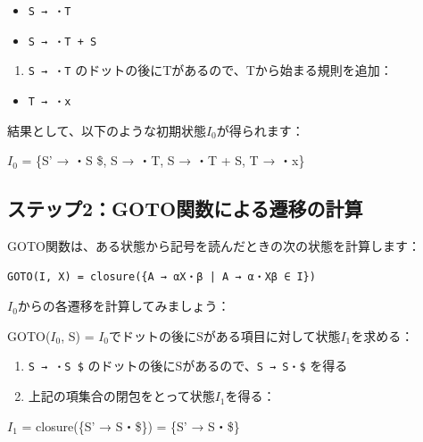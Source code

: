 \begin{itemize}
\tightlist
\item
  \texttt{S\ →\ ・T}
\item
  \texttt{S\ →\ ・T\ +\ S}
\end{itemize}

\begin{enumerate}
\def\labelenumi{\arabic{enumi}.}
\setcounter{enumi}{2}
\tightlist
\item
  \texttt{S\ →\ ・T} のドットの後にTがあるので、Tから始まる規則を追加：
\end{enumerate}

\begin{itemize}
\tightlist
\item
  \texttt{T\ →\ ・x}
\end{itemize}

結果として、以下のような初期状態\(I_0\)が得られます：

\(I_0\) = \{S' → ・S \$, S → ・T, S → ・T + S, T → ・x\}

\hypertarget{chapter5-ux30b9ux30c6ux30c3ux30d72gotoux95a2ux6570ux306bux3088ux308bux9077ux79fbux306eux8a08ux7b97}{%
\subsection{ステップ2：GOTO関数による遷移の計算}\label{chapter5-ux30b9ux30c6ux30c3ux30d72gotoux95a2ux6570ux306bux3088ux308bux9077ux79fbux306eux8a08ux7b97}}

GOTO関数は、ある状態から記号を読んだときの次の状態を計算します：

\begin{verbatim}
GOTO(I, X) = closure({A → αX・β | A → α・Xβ ∈ I})
\end{verbatim}

\(I_0\)からの各遷移を計算してみましょう：

GOTO(\(I_0\), S) =
\(I_0\)でドットの後にSがある項目に対して状態\(I_1\)を求める：

\begin{enumerate}
\def\labelenumi{\arabic{enumi}.}
\tightlist
\item
  \texttt{S\textquotesingle{}\ →\ ・S\ \$}
  のドットの後にSがあるので、\texttt{S\textquotesingle{}\ →\ S・\$}
  を得る
\item
  上記の項集合の閉包をとって状態\(I_1\)を得る：
\end{enumerate}

\(I_1\) = closure(\{S' → S・\$\}) = \{S' → S・\$\}

